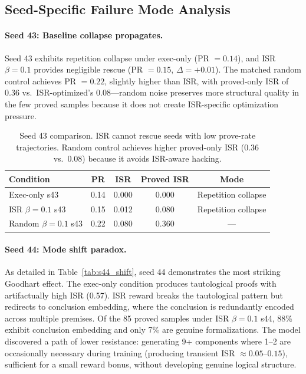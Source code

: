 \documentclass[11pt,a4paper]{article}
\begin{document}
\subsection{Seed-Specific Failure Mode Analysis}

\paragraph{Seed 43: Baseline collapse propagates.}
Seed 43 exhibits repetition collapse under exec-only (PR $= 0.14$), and ISR $\beta{=}0.1$ provides negligible rescue (PR $= 0.15$, $\Delta = +0.01$).
The matched random control achieves PR $= 0.22$, slightly higher than ISR, with proved-only ISR of 0.36 vs.\ ISR-optimized's 0.08---random noise preserves more structural quality in the few proved samples because it does not create ISR-specific optimization pressure.

\begin{table}[t]
\centering
\small
\begin{tabular}{lcccc}
\toprule
\textbf{Condition} & \textbf{PR} & \textbf{ISR} & \textbf{Proved ISR} & \textbf{Mode} \\
\midrule
Exec-only s43 & 0.14 & 0.000 & 0.000 & Repetition collapse \\
ISR $\beta{=}0.1$ s43 & 0.15 & 0.012 & 0.080 & Repetition collapse \\
Random $\beta{=}0.1$ s43 & 0.22 & 0.080 & 0.360 & --- \\
\bottomrule
\end{tabular}
\caption{Seed 43 comparison. ISR cannot rescue seeds with low prove-rate trajectories. Random control achieves higher proved-only ISR (0.36 vs.\ 0.08) because it avoids ISR-aware hacking.}
\label{tab:s43}
\end{table}

\paragraph{Seed 44: Mode shift paradox.}
As detailed in Table~\ref{tab:s44_shift}, seed 44 demonstrates the most striking Goodhart effect.
The exec-only condition produces tautological proofs with artifactually high ISR (0.57).
ISR reward breaks the tautological pattern but redirects to conclusion embedding, where the conclusion is redundantly encoded across multiple premises.
Of the 85 proved samples under ISR $\beta{=}0.1$ s44, 88\% exhibit conclusion embedding and only 7\% are genuine formalizations.
The model discovered a path of lower resistance: generating 9+ components where 1--2 are occasionally necessary during training (producing transient ISR $\approx 0.05\text{--}0.15$), sufficient for a small reward bonus, without developing genuine logical structure.
\end{document}
